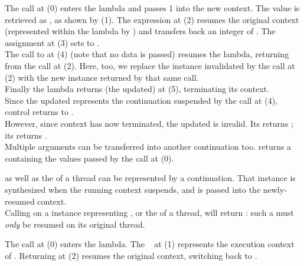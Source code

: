 
The  call at (0) enters the lambda and passes 1 into the
new context. The value is retrieved as , as shown by (1). The expression
 at (2) resumes the original context (represented
within the lambda by ) and transfers back an integer of .
The assignment at (3) sets  to .\\

The call to  at (4) (note that no data is passed) resumes the
lambda, returning from the  call at (2). Here, too,
we replace the \cont instance  invalidated by the \resume call at (2)
with the new instance returned by that same \resume call.\\

Finally the lambda returns (the updated)  at (5), terminating its
context.\\

Since the updated  represents the continuation suspended by the call at
(4), control returns to \main.\\

However, since context  has now terminated, the updated  is
invalid. Its \opbool returns ; its  returns
.\\

Multiple arguments can be transferred into another continuation too.
 returns a 
containing the values passed by the \callcc call at (0).


\label{subsec:main}

\main as well as the \entryfn of a thread can be represented by a continuation.
That \cont instance is synthesized when the running context suspends, and is
passed into the newly-resumed context.\\

Calling \anythread on a \cont instance representing \main, or
the \entryfn of a thread, will return : such a \cont
must \emph{only} be resumed on its original thread.

The  call at (0) enters the lambda. The \cont\  at (1)
represents the execution context of \main. Returning  at (2) resumes the
original context, switching back to \main.


